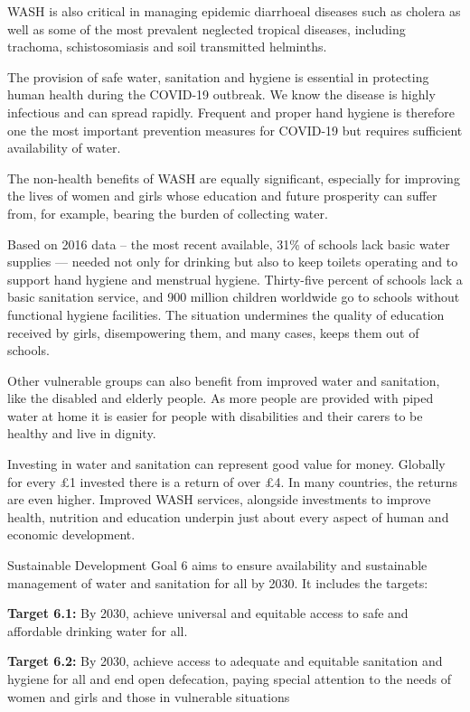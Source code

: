 WASH is also critical in managing epidemic diarrhoeal diseases such as cholera as well as some of the most prevalent neglected tropical diseases, including trachoma, schistosomiasis and soil transmitted helminths. %

The provision of safe water, sanitation and hygiene is essential in protecting human health during the COVID-19 outbreak. %
We know the disease is highly infectious and can spread rapidly. %
Frequent and proper hand hygiene is therefore one the most important prevention measures for COVID-19 but requires sufficient availability of water. %

The non-health benefits of WASH are equally significant, especially for improving the lives of women and girls whose education and future prosperity can suffer from, for example, bearing the burden of collecting water. %

Based on 2016 data – the most recent available, 31\% of schools lack basic water supplies --- needed not only for drinking but also to keep toilets operating and to support hand hygiene and menstrual hygiene. %
Thirty-five percent of schools lack a basic sanitation service, and 900 million children worldwide go to schools without functional hygiene facilities. %
The situation undermines the quality of education received by girls, disempowering them, and many cases, keeps them out of schools. %

Other vulnerable groups can also benefit from improved water and sanitation, like the disabled and elderly people. %
As more people are provided with piped water at home it is easier for people with disabilities and their carers to be healthy and live in dignity. %

Investing in water and sanitation can represent good value for money. %
Globally for every \pounds 1 invested there is a return of over \pounds 4. %
In many countries, the returns are even higher. %
Improved WASH services, alongside investments to improve health, nutrition and education underpin just about every aspect of human and economic development. %

Sustainable Development Goal 6 aims to ensure availability and sustainable management of water and sanitation for all by 2030. It includes the targets:

\begin{adjustwidth}{0.5cm}{}
\textbf{Target 6.1:} By 2030, achieve universal and equitable access to safe and affordable drinking water for all.

\medskip

\noindent\textbf{Target 6.2:} By 2030, achieve access to adequate and equitable sanitation and hygiene for all and end open defecation, paying special attention to the needs of women and girls and those in vulnerable situations
\end{adjustwidth}

